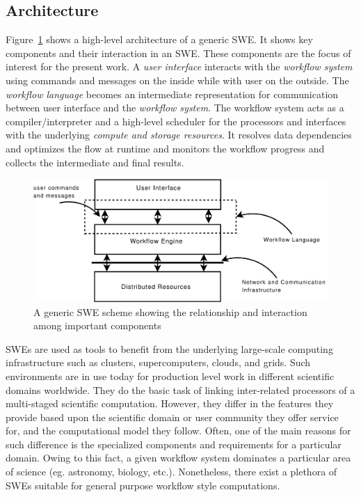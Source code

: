 \subsection{Architecture}
Figure~\ref{fig:wfms} shows a high-level architecture of a generic SWE. It shows key
components and their interaction in an SWE. These components are the focus of
interest for the present work. A \textit{user interface} interacts with the
\textit{workflow system} using commands and messages on the inside while with
user on the outside. The \textit{workflow language} becomes an intermediate
representation for communication between user interface and the
\textit{workflow system}. The workflow system acts as a compiler/interpreter
and a high-level scheduler for the processors and interfaces with the
underlying \textit{compute and storage resources}. It resolves data dependencies and
optimizes the flow at runtime and monitors the workflow progress and collects
the intermediate and final results.

%
\begin{figure}[htb]
\begin{center}
\includegraphics[width=\linewidth]{figures/workflow_interfaces_and_language}
\caption{A generic SWE scheme showing the relationship and interaction among important components}
\label{fig:wfms}
\end{center}
\end{figure}
%
SWEs are used as tools to benefit from the underlying large-scale computing
infrastructure such as clusters, supercomputers, clouds, and grids. Such
environments are in use today for production level work in different scientific
domains worldwide. They do the basic task of linking inter-related processors
of a multi-staged scientific computation. However, they differ in the features
they provide based upon the scientific domain or user community they offer
service for, and the computational model they follow. Often, one of the main
reasons for such difference is the specialized components and requirements for
a particular domain. Owing to this fact, a given workflow system dominates a
particular area of science (eg. astronomy, biology, etc.). Nonetheless, there
exist a plethora of SWEs suitable for general purpose workflow style
computations.

